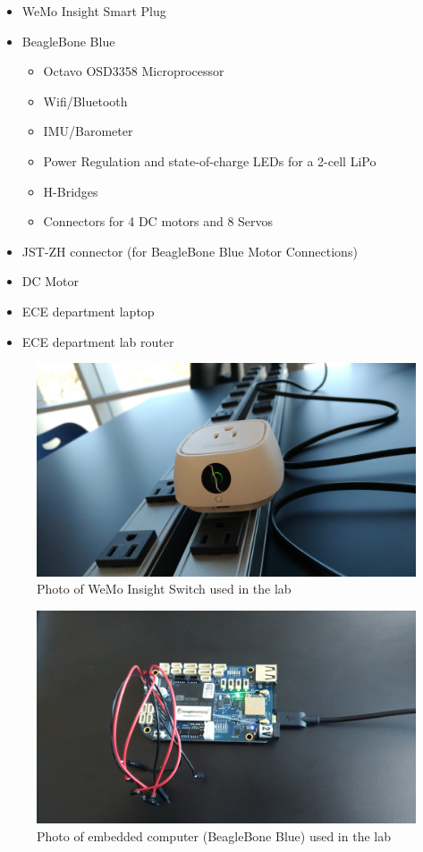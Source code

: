 \documentclass[letterpaper,12pt]{article}   %
\begin{document}
\begin{itemize}
    \item WeMo Insight Smart Plug
    \item BeagleBone Blue
    \begin{itemize}
        \item Octavo OSD3358 Microprocessor
        \item Wifi/Bluetooth
        \item IMU/Barometer
        \item Power Regulation and state-of-charge LEDs for a 2-cell LiPo
        \item H-Bridges
        \item Connectors for 4 DC motors and 8 Servos
    \end{itemize}
    \item JST-ZH connector (for BeagleBone Blue Motor Connections)
    \item DC Motor
    \item ECE department laptop
    \item ECE department lab router
\end{itemize}

\begin{figure}[H]
    \centering
    \includegraphics[scale=0.09]{figs/wemo.jpg}
    \caption{Photo of WeMo Insight Switch used in the lab}
    \label{fig:expLabSetup}
\end{figure}

\begin{figure}[H]
    \centering
    \includegraphics[scale=0.09]{figs/beagleBone.jpg}
    \caption{Photo of embedded computer (BeagleBone Blue) used in the lab}
    \label{fig:expLabSetup}
\end{figure}
\end{document}

